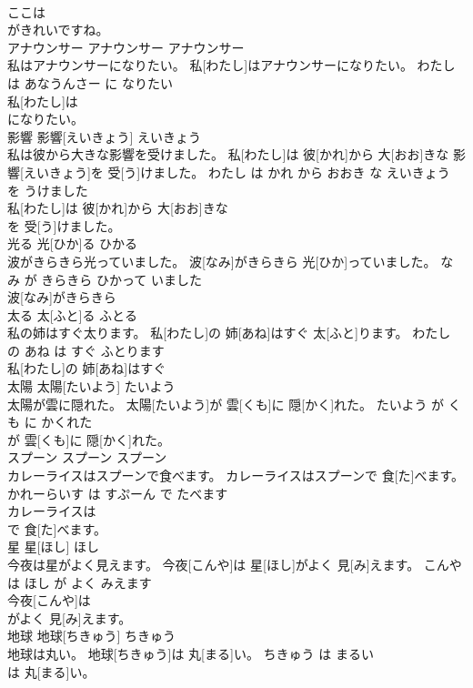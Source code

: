 \documentclass[8pt]{extreport}
\begin{document}
\begin{CJK}{UTF8}{min}
\\	ここは
\\	がきれいですね。		
\\	アナウンサー	アナウンサー	アナウンサー	
\\	私はアナウンサーになりたい。	私[わたし]はアナウンサーになりたい。	わたし は あなうんさー に なりたい	
\\	私[わたし]は
\\	になりたい。		
\\	影響	影響[えいきょう]	えいきょう	
\\	私は彼から大きな影響を受けました。	私[わたし]は 彼[かれ]から 大[おお]きな 影響[えいきょう]を 受[う]けました。	わたし は かれ から おおき な えいきょう を うけました	
\\	私[わたし]は 彼[かれ]から 大[おお]きな
\\	を 受[う]けました。		
\\	光る	光[ひか]る	ひかる	
\\	波がきらきら光っていました。	波[なみ]がきらきら 光[ひか]っていました。	なみ が きらきら ひかって いました	
\\	波[なみ]がきらきら
\\	太る	太[ふと]る	ふとる	
\\	私の姉はすぐ太ります。	私[わたし]の 姉[あね]はすぐ 太[ふと]ります。	わたし の あね は すぐ ふとります	
\\	私[わたし]の 姉[あね]はすぐ
\\	太陽	太陽[たいよう]	たいよう	
\\	太陽が雲に隠れた。	太陽[たいよう]が 雲[くも]に 隠[かく]れた。	たいよう が くも に かくれた	
\\	が 雲[くも]に 隠[かく]れた。		
\\	スプーン	スプーン	スプーン	
\\	カレーライスはスプーンで食べます。	カレーライスはスプーンで 食[た]べます。	かれーらいす は すぷーん で たべます	
\\	カレーライスは
\\	で 食[た]べます。		
\\	星	星[ほし]	ほし	
\\	今夜は星がよく見えます。	今夜[こんや]は 星[ほし]がよく 見[み]えます。	こんや は ほし が よく みえます	
\\	今夜[こんや]は
\\	がよく 見[み]えます。		
\\	地球	地球[ちきゅう]	ちきゅう	
\\	地球は丸い。	地球[ちきゅう]は 丸[まる]い。	ちきゅう は まるい	
\\	は 丸[まる]い。		

\end{CJK}
\end{document}
